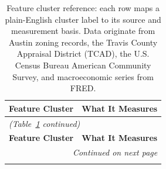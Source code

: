 \begingroup
\small
\renewcommand{\arraystretch}{1.2}
\begin{longtable}{p{} p{}}
 \caption[Semantic Feature Aggregation Mapping]{Feature cluster reference: each row maps a plain-English cluster label to its source and measurement basis. Data originate from Austin zoning records, the Travis County Appraisal District (TCAD), the U.S. Census Bureau American Community Survey, and macroeconomic series from FRED.}
 \label{tab:semantic_mapping} \\
 \toprule
 \textbf{Feature Cluster} & \textbf{What It Measures} \\
 \midrule
 \endfirsthead
 \multicolumn{2}{l}{\small\textit{(Table~\ref*{tab:semantic_mapping} continued)}} \\
 \toprule
 \textbf{Feature Cluster} & \textbf{What It Measures} \\
 \midrule
 \endhead
 \midrule
 \multicolumn{2}{r}{\small\textit{Continued on next page}} \\
 \endfoot
 \bottomrule
 \endlastfoot


\end{longtable}
